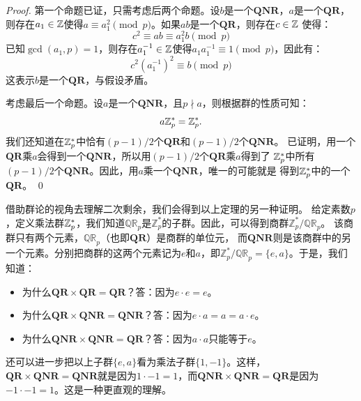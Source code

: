   \begin{proof}
  第一个命题已证，只需考虑后两个命题。设$b$是一个$\mathbf{QNR}$，$a$是一个$\mathbf{QR}$，
  则存在$a_1\in {\mathbb Z}$使得$a \equiv a_1^2 \pmod{p}$。如果$ab$是一个$\mathbf{QR}$，则存在$c\in {\mathbb Z}$
  使得：
  \[ c^2 \equiv ab \equiv a_1^2 b \pmod{p} \] 
  已知$\gcd(a_1, p) = 1$，则存在$a_1^{-1} \in {\mathbb Z}$使得$a_1 a_1^{-1} \equiv 1 \pmod{p}$，因此有：
  \[ c^2 ( a_1^{-1})^2 \equiv b \pmod{p}\]
  这表示$b$是一个$\mathbf{QR}$，与假设矛盾。
  
  考虑最后一个命题。设$a$是一个$\mathbf{QNR}$，且$p  \nmid a$，则根据群的性质可知：
  \[a {\mathbb Z}_p^* = {\mathbb Z}_p^*.\] 
  我们还知道在${\mathbb Z}_p^*$中恰有$(p-1)/2$个$\mathbf{QR}$和$(p-1)/2$个$\mathbf{QNR}$。
  已证明，用一个$\mathbf{QR}$乘$a$会得到一个$\mathbf{QNR}$，所以用$(p-1)/2$个$\mathbf{QR}$乘$a$得到了
  ${\mathbb Z}_p^*$中所有$(p-1)/2$个$\mathbf{QNR}$。因此，用$a$乘一个$\mathbf{QNR}$，唯一的可能就是
  得到${\mathbb Z}_p^*$中的一个$\mathbf{QR}$。
  \qed
  \end{proof}
  
 借助群论的视角去理解二次剩余，我们会得到以上定理的另一种证明。
 给定素数$p$，定义乘法群${\mathbb Z}_p^*$，我们知道$\mathbb{QR}_p$是$\mathbb{Z}_p^*$的子群。因此，可以得到商群$\mathbb{Z}_p^*/\mathbb{QR}_p$。
 该商群只有两个元素，$\mathbb{QR}_p$（也即$\mathbf{QR}$）是商群的单位元，
 而$\mathbf{QNR}$则是该商群中的另一个元素。分别把商群的这两个元素记为$e$和$a$，即$\mathbb{Z}_p^*/\mathbb{QR}_p = \{e, a\}$。于是，我们知道：
      \begin{itemize}
      \item 为什么$\mathbf{QR} \times \mathbf{QR} = \mathbf{QR}$？答：因为$e \cdot e = e$。
      
      \item 为什么$\mathbf{QR} \times \mathbf{QNR} = \mathbf{QNR}$？答：因为$e \cdot a = a = a \cdot e$。
      
      \item 为什么$\mathbf{QNR} \times \mathbf{QNR} = \mathbf{QR}$？答：因为$a \cdot a$只能等于$e$。
      \end{itemize} 

还可以进一步把以上子群$\{e, a\}$看为乘法子群$\{1, -1\}$。这样，$\mathbf{QR} \times \mathbf{QNR} = \mathbf{QNR}$就是因为$1 \cdot -1 = 1$，而$\mathbf{QNR} \times \mathbf{QNR} = \mathbf{QR}$是因为$-1 \cdot -1 = 1$。这是一种更直观的理解。

